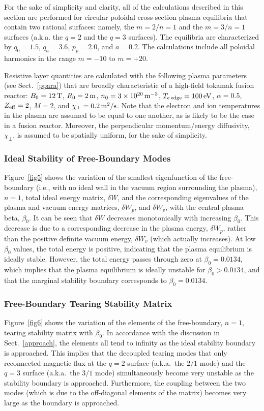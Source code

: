 \documentclass[12pt,prb,aps]{revtex4-1}
\begin{document}
For the sake of simplicity and clarity, all of the calculations described in this section are performed for circular poloidal cross-section plasma equilibria that contain two rational surfaces: namely, the $m=2/n=1$ and the $m=3/n=1$ surfaces (a.k.a. the $q=2$ and the $q=3$ surfaces). 
The equilibria are characterized by $q_0=1.5$, $q_a=3.6$, $p_p=2.0$, and $a=0.2$. The calculations include all poloidal harmonics in the range $m=-10$ to $m=+20$. 

Resistive layer quantities are calculated with the following plasma parameters (see Sect.~\ref{ppara}) that are broadly characteristic of a high-field tokamak fusion reactor:
$B_0=12\,{\rm T}$, $R_0=2\,{\rm m}$, $n_0=3\times 10^{20}\,{\rm m}^{-3}$, $T_{e\,{\rm edge}}=100\,{\rm eV}$, $\alpha =0.5$, $Z_{\rm eff}=2$, $M=2$, 
and $\chi_\perp=0.2\,{\rm m^2/s}$. Note that the electron and ion temperatures in the plasma are assumed to be equal to one another, as is likely to be the case in a
fusion reactor. Moreover, the
perpendicular momentum/energy diffusivity, $\chi_\perp$, is assumed to be spatially uniform, for the sake of simplicity. 

\subsubsection{Ideal Stability of Free-Boundary Modes}
Figure~\ref{fig5} shows the variation of the smallest eigenfunction of the free-boundary (i.e., with no ideal wall in the vacuum region surrounding the plasma), $n=1$, 
total ideal energy matrix, $\delta W$, and the corresponding eigenvalues of the plasma and vacuum energy matrices, $\delta W_p$, and $\delta W_v$, with the
central plasma beta, $\beta_0$. It can be seen that $\delta W$ decreases monotonically with increasing $\beta_0$. This decrease is due
to a corresponding decrease in the plasma energy, $\delta W_p$, rather than the positive definite vacuum energy, $\delta W_v$ (which actually increases). 
At low $\beta_0$ values, the total energy is positive, indicating that the plasma equilibrium is ideally stable.\cite{freidberg,ideal} However,  the
total energy passes through zero at $\beta_0=0.0134$, which implies that the plasma equilibrium is ideally unstable for $\beta_0>0.0134$,
and that the marginal stability boundary corresponds to $\beta_0=0.0134$. 

\subsubsection{Free-Boundary Tearing Stability Matrix}
Figure~\ref{fig6} shows the variation of the elements of the free-boundary, $n=1$, tearing stability matrix with $\beta_0$. In accordance with the discussion in
Sect.~\ref{approach}, the elements all tend to infinity as the ideal stability boundary is approached. This implies that the decoupled tearing modes that
only reconnected magnetic flux at the $q=2$ surface (a.k.a.\ the $2/1$ mode) and the $q=3$ surface  (a.k.a.\ the $3/1$ mode)  simultaneously become very unstable as the
stability boundary is approached. Furthermore, the coupling between the two modes (which is due to the off-diagonal elements of the matrix)
becomes very large as the  boundary is approached. 
\end{document}
